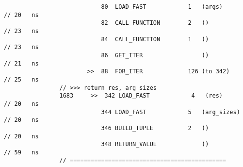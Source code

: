\begin{code}
\begin{verbatim}
                            80  LOAD_FAST            1   (args)                                     // 20   ns
                            82  CALL_FUNCTION        2   ()                                         // 23   ns
                            84  CALL_FUNCTION        1   ()                                         // 23   ns
                            86  GET_ITER                 ()                                         // 21   ns
                        >>  88  FOR_ITER             126 (to 342)                                   // 25   ns
                // >>> return res, arg_sizes
                1683     >>  342 LOAD_FAST            4   (res)                                     // 20   ns
                            344 LOAD_FAST            5   (arg_sizes)                                // 20   ns
                            346 BUILD_TUPLE          2   ()                                         // 20   ns
                            348 RETURN_VALUE             ()                                         // 59   ns
                // =============================================


\end{verbatim}
\end{code}
